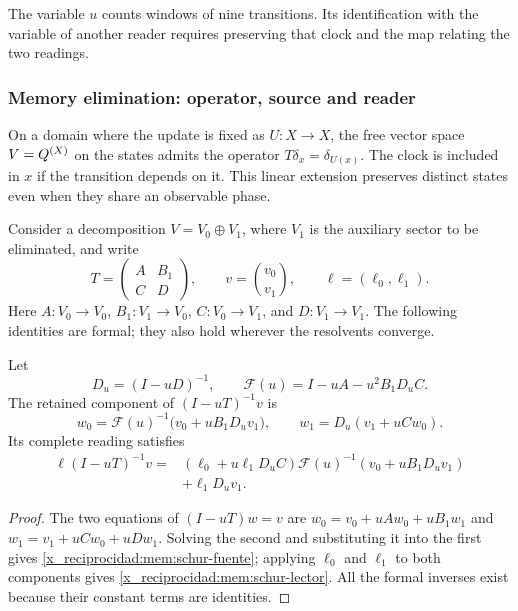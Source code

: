 The variable \(u\) counts windows of nine transitions. Its identification
with the variable of another reader requires preserving that clock and the map
relating the two readings.

\subsubsection{Memory elimination: operator, source and reader}

On a domain where the update is fixed as \(U:X\to X\),
the free vector space \(V=Q^{(X)}\) on the states admits the operator
\(T\delta_x=\delta_{U(x)}\). The clock is included in \(x\) if
the transition depends on it. This linear extension preserves distinct
states even when they share an observable phase.

Consider a decomposition \(V=V_0\oplus V_1\), where \(V_1\)
is the auxiliary sector to be eliminated, and write
\[
 T=\begin{pmatrix}A&B_1\\C&D\end{pmatrix},\qquad
 v=\binom{v_0}{v_1},\qquad \ell=(\ell_0,\ell_1).
\]
Here \(A:V_0\to V_0\), \(B_1:V_1\to V_0\),
\(C:V_0\to V_1\), and \(D:V_1\to V_1\).
The following identities are formal; they also hold wherever the
resolvents converge.

\begin{proposition}
\label{x_reciprocidad:mem:prop-schur}
Let
\[
 D_u=(I-uD)^{-1},\qquad
 \mathscr F(u)=I-uA-u^2B_1D_uC.
\]
The retained component of \((I-uT)^{-1}v\) is
\begin{equation}
 w_0=\mathscr F(u)^{-1}\bigl(v_0+uB_1D_uv_1\bigr),
 \qquad w_1=D_u(v_1+uCw_0).
 \label{x_reciprocidad:mem:schur-fuente}
\end{equation}
Its complete reading satisfies
\begin{equation}
 \begin{split}
 \ell(I-uT)^{-1}v
 ={}&(\ell_0+u\ell_1D_uC)
       \mathscr F(u)^{-1}(v_0+uB_1D_uv_1)\\
    &+\ell_1D_uv_1.
 \end{split}
 \label{x_reciprocidad:mem:schur-lector}
\end{equation}
\end{proposition}
\begin{proof}
The two equations of \((I-uT)w=v\) are
\(w_0=v_0+uAw_0+uB_1w_1\) and
\(w_1=v_1+uCw_0+uDw_1\).
Solving the second and substituting it into the first gives
\eqref{x_reciprocidad:mem:schur-fuente}; applying \(\ell_0\) and \(\ell_1\)
to both components gives \eqref{x_reciprocidad:mem:schur-lector}.
All the formal inverses exist because their constant terms
are identities.
\end{proof}

